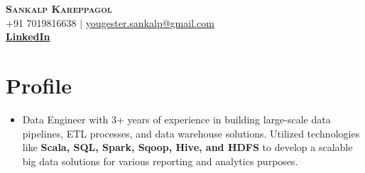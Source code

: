 \documentclass[letterpaper,11pt]{article}
\begin{document}




\begin{center}
    \textbf{\Huge \scshape Sankalp Kareppagol} \\ \vspace{1pt}
    \small +91 7019816638 $|$ \href{mailto:yougester.sankalp@gmail.com}{{yougester.sankalp@gmail.com}}    \\ 
    \small  
    \href{https://linkedin.com/in/sankalp-k-18b41016a/}{\bf LinkedIn} %
    
\end{center}



\section{Profile}
\begin{itemize}[leftmargin=0.15in, label={}]
\item 
Data Engineer with 3+ years of experience in building large-scale data pipelines, ETL processes, and data warehouse solutions. Utilized technologies like \textbf{Scala, SQL, Spark, Sqoop, Hive, and HDFS} to develop a scalable big data solutions for various
reporting and analytics purposes.
\end{itemize}
\end{document}
